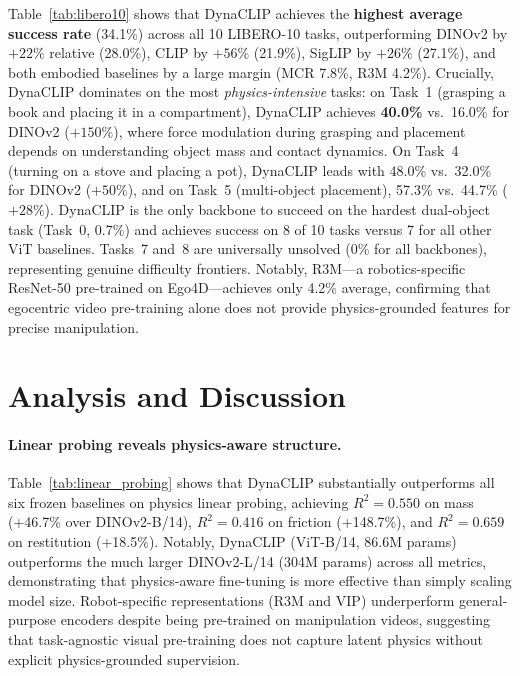 \documentclass{article}
\newcommand{\methodname}{DynaCLIP}
\begin{document}
Table~\ref{tab:libero10} shows that \methodname{} achieves the \textbf{highest average success rate} (34.1\%) across all 10 LIBERO-10 tasks, outperforming DINOv2 by $+22\%$ relative (28.0\%), CLIP by $+56\%$ (21.9\%), SigLIP by $+26\%$ (27.1\%), and both embodied baselines by a large margin (MCR 7.8\%, R3M 4.2\%). Crucially, \methodname{} dominates on the most \emph{physics-intensive} tasks: on Task~1 (grasping a book and placing it in a compartment), \methodname{} achieves \textbf{40.0\%} vs.\ 16.0\% for DINOv2 ($+150\%$), where force modulation during grasping and placement depends on understanding object mass and contact dynamics. On Task~4 (turning on a stove and placing a pot), \methodname{} leads with 48.0\% vs.\ 32.0\% for DINOv2 ($+50\%$), and on Task~5 (\mbox{multi-object} placement), 57.3\% vs.\ 44.7\% ($+28\%$). \methodname{} is the only backbone to succeed on the hardest dual-object task (Task~0, 0.7\%) and achieves success on 8 of 10 tasks versus 7 for all other ViT baselines. Tasks~7 and~8 are universally unsolved (0\% for all backbones), representing genuine difficulty frontiers. Notably, R3M---a robotics-specific ResNet-50 pre-trained on Ego4D---achieves only 4.2\% average, confirming that egocentric video pre-training alone does not provide physics-grounded features for precise manipulation.



\section{Analysis and Discussion}
\label{sec:discussion}

\paragraph{Linear probing reveals physics-aware structure.}
Table~\ref{tab:linear_probing} shows that \methodname{} substantially outperforms all six frozen baselines on physics linear probing, achieving $R^2 = 0.550$ on mass (+46.7\% over DINOv2-B/14), $R^2 = 0.416$ on friction (+148.7\%), and $R^2 = 0.659$ on restitution (+18.5\%). Notably, \methodname{} (ViT-B/14, 86.6M params) outperforms the much larger DINOv2-L/14 (304M params) across all metrics, demonstrating that physics-aware fine-tuning is more effective than simply scaling model size. Robot-specific representations (R3M and VIP) underperform general-purpose encoders despite being pre-trained on manipulation videos, suggesting that task-agnostic visual pre-training does not capture latent physics without explicit physics-grounded supervision.
\end{document}

